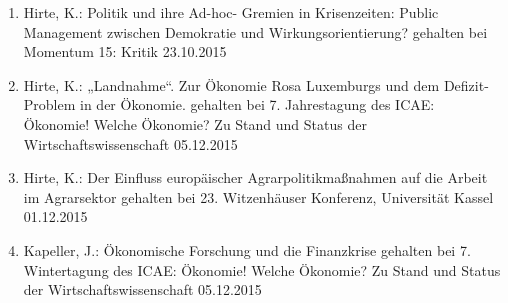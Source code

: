 \begin{enumerate}
	\item Hirte, K.: Politik und ihre Ad-hoc- Gremien in Krisenzeiten: Public Management zwischen Demokratie und Wirkungsorientierung? gehalten bei Momentum 15: Kritik 23.10.2015
	\item Hirte, K.: „Landnahme“. Zur Ökonomie Rosa Luxemburgs und dem Defizit-Problem in der Ökonomie. gehalten bei 7. Jahrestagung des ICAE: Ökonomie! Welche Ökonomie? Zu Stand und Status der Wirtschaftswissenschaft 05.12.2015
	\item Hirte, K.: Der Einfluss europäischer Agrarpolitikmaßnahmen auf die Arbeit im Agrarsektor gehalten bei 23. Witzenhäuser Konferenz, Universität Kassel 01.12.2015
	\item Kapeller, J.: Ökonomische Forschung und die Finanzkrise gehalten bei 7. Wintertagung des ICAE: Ökonomie! Welche Ökonomie? Zu Stand und Status der Wirtschaftswissenschaft 05.12.2015
\end{enumerate}

